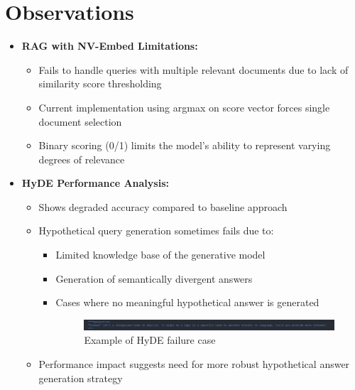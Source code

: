 \section{Observations}
\begin{itemize}
    \item \textbf{RAG with NV-Embed Limitations:}
    \begin{itemize}
        \item Fails to handle queries with multiple relevant documents due to lack of similarity score thresholding
        \item Current implementation using argmax on score vector forces single document selection
        \item Binary scoring (0/1) limits the model's ability to represent varying degrees of relevance
    \end{itemize}
    
    \item \textbf{HyDE Performance Analysis:}
    \begin{itemize}
        \item Shows degraded accuracy compared to baseline approach
        \item Hypothetical query generation sometimes fails due to:
        \begin{itemize}
            \item Limited knowledge base of the generative model
            \item Generation of semantically divergent answers
            \item Cases where no meaningful hypothetical answer is generated
            \begin{figure}[ht]
                \centering
                \includegraphics[width=1.0\textwidth, height=0.05\textheight]{IMAGE/hyde_fail.png}
                \caption{Example of HyDE failure case}
                \label{fig:hyde_failure}
            \end{figure}
        \end{itemize}
        \item Performance impact suggests need for more robust hypothetical answer generation strategy
    \end{itemize}
\end{itemize}




